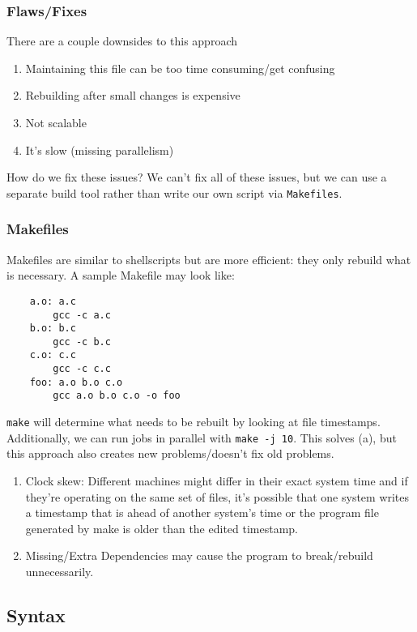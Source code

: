 \documentclass[13pt]{article}
\begin{document}
\subsubsection{Flaws/Fixes}
There are a couple downsides to this approach
\begin{enumerate}[label=(\alph*)]
\item  Maintaining this file can be too time consuming/get confusing
\item Rebuilding after small changes is expensive
\item Not scalable
\item It's slow (missing parallelism)
\end{enumerate}
How do we fix these issues? We can't fix all of these issues, but we can use a separate build tool rather than write our own script via \texttt{Makefiles}.

\subsubsection{Makefiles}
Makefiles are similar to shellscripts but are more efficient: they only rebuild what is necessary. A sample Makefile may look like:
\begin{verbatim}
    a.o: a.c
        gcc -c a.c
    b.o: b.c
        gcc -c b.c
    c.o: c.c
        gcc -c c.c
    foo: a.o b.o c.o
        gcc a.o b.o c.o -o foo
\end{verbatim}
\texttt{make} will determine what needs to be rebuilt by looking at file timestamps. Additionally, we can run jobs in parallel with \texttt{make -j 10}. This solves (a), but this approach also creates new problems/doesn't fix old problems.

\begin{enumerate}[label=(\roman*)]
\item Clock skew: Different machines might differ in their exact system time and if they’re operating on the same set of files, it's possible that one system writes a timestamp that is ahead of another system’s time or the program file generated by make is older than the edited timestamp.
\item Missing/Extra Dependencies may cause the program to break/rebuild unnecessarily.
\end{enumerate}





\subsection{Syntax}
\end{document}
